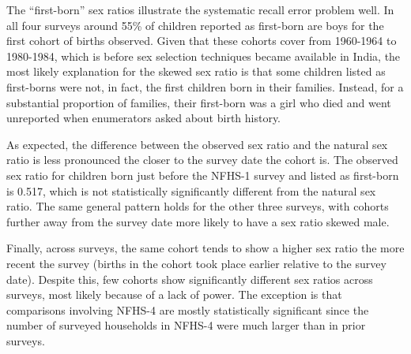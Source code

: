 \documentclass[12pt,letterpaper]{article}
\begin{document}
% 


The ``first-born'' sex ratios illustrate the systematic recall error problem well.
In all four surveys around 55\% of children reported as first-born are boys
for the first cohort of births observed.
Given that these cohorts cover from 1960-1964 to 1980-1984, which is before sex selection 
techniques became available in India, the most likely explanation for the skewed sex ratio 
is that some children listed as first-borns were not, in fact, the first children born in 
their families.
Instead, for a substantial proportion of families, their first-born was a girl who died 
and went unreported when enumerators asked about birth history.

As expected, the difference between the observed sex ratio and the natural sex ratio is 
less pronounced the closer to the survey date the cohort is.
The observed sex ratio for children born just before the NFHS-1 survey and listed as 
first-born is 0.517, which is not statistically significantly different from the
natural sex ratio.
The same general pattern holds for the other three surveys, with cohorts further away
from the survey date more likely to have a sex ratio skewed male.


Finally, across surveys, the same cohort tends to show a higher sex ratio the more recent 
the survey (births in the cohort took place earlier relative to the survey date).
Despite this, few cohorts show significantly different sex ratios across surveys, most 
likely because of a lack of power.
The exception is that comparisons involving NFHS-4 are mostly statistically significant
since the number of surveyed households in NFHS-4 were much larger than in prior surveys.
\end{document}
